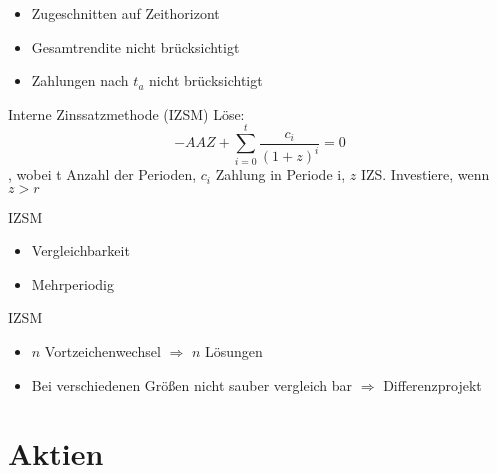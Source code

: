 \begin{why}
	\begin{itemize}
		\item Zugeschnitten auf Zeithorizont
	\end{itemize}
\end{why}
\begin{whynot}
	\begin{itemize}
		\item Gesamtrendite nicht brücksichtigt
		\item Zahlungen nach $t_a$ nicht brücksichtigt
	\end{itemize}
\end{whynot}
\begin{defi}{Interne Zinssatzmethode (IZSM)}
	Löse:
	$$ -AAZ + \sum_{i=0}^{t} \frac{c_i}{(1 + z)^i} = 0 $$
	, wobei  t Anzahl der Perioden, $c_i$ Zahlung in Periode i, $z$ IZS.
	Investiere, wenn $z > r$
\end{defi}
\begin{why}{IZSM}
	\begin{itemize}
		\item Vergleichbarkeit
		\item Mehrperiodig
	\end{itemize}
\end{why}
\begin{why}{IZSM}
	\begin{itemize}
		\item $n$ Vortzeichenwechsel $\Rightarrow$ $n$  Lösungen
		\item Bei verschiedenen Größen nicht sauber vergleich bar $\Rightarrow$ Differenzprojekt
	\end{itemize}
\end{why}
\section{Aktien}
